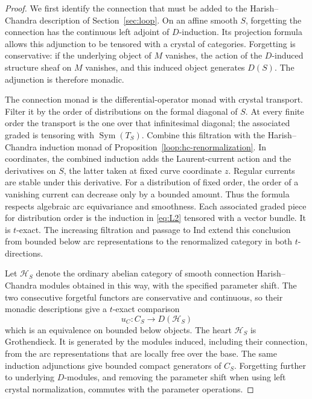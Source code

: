\begin{proof}
We first identify the connection that must be added to the
Harish--Chandra description of Section~\ref{sec:loop}.  On an affine
smooth $S$, forgetting the connection has the continuous left adjoint
of $D$-induction.  Its projection formula allows this adjunction to be
tensored with a crystal of categories.  Forgetting is conservative:
if the underlying object of $M$ vanishes, the action of the
$D$-induced structure sheaf on $M$ vanishes, and this induced object
generates $D(S)$.  The adjunction is therefore monadic.

The connection monad is the differential-operator monad with crystal
transport.  Filter it by the order of distributions on the formal
diagonal of $S$.  At every finite order the transport is the one over
that infinitesimal diagonal; the associated graded is tensoring with
$\operatorname{Sym}(T_S)$.  Combine this filtration with the
Harish--Chandra induction monad of Proposition~\ref{loop:hc-renormalization}.
In coordinates, the combined induction adds the Laurent-current
action and the derivatives on $S$, the latter taken at fixed curve
coordinate $z$.  Regular currents are stable under this derivative.
For a distribution of fixed order, the order of a vanishing current
can decrease only by a bounded amount.  Thus the formula respects
algebraic arc equivariance and smoothness.  Each associated graded
piece for distribution order is the induction in \eqref{eq:L2}
tensored with a vector bundle.  It is $t$-exact.  The increasing
filtration and passage to Ind extend this conclusion from bounded
below arc representations to the renormalized category in both
$t$-directions.

Let $\mathcal H_S$ denote the ordinary abelian category of smooth
connection Harish--Chandra modules obtained in this way, with the
specified parameter shift.  The two consecutive forgetful functors
are conservative and continuous, so their monadic descriptions give
a $t$-exact comparison
\[
                       u_C:C_S\longrightarrow D(\mathcal H_S)
\]
which is an equivalence on bounded below objects.  The heart
$\mathcal H_S$ is Grothendieck.  It is generated by the modules induced,
including their connection, from the arc representations that are
locally free over the base.  The same induction adjunctions give
bounded compact generators of $C_S$.  Forgetting further to underlying
$D$-modules, and removing the parameter shift when using left crystal
normalization, commutes with the parameter operations.


\end{proof}
